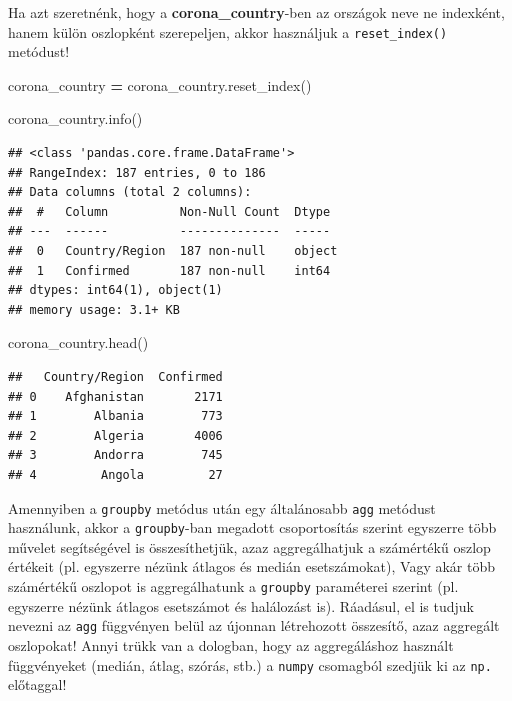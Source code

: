 \documentclass[
]{book}
\newenvironment{Shaded}{\begin{snugshade}}{\end{snugshade}}
\newcommand{\NormalTok}[1]{#1}
\newcommand{\OperatorTok}[1]{\textcolor[rgb]{0.81,0.36,0.00}{\textbf{#1}}}
\begin{document}
Ha azt szeretnénk, hogy a \textbf{corona\_country}-ben az országok neve ne indexként, hanem külön oszlopként szerepeljen, akkor használjuk a \texttt{reset\_index()} metódust!

\begin{Shaded}
\begin{Highlighting}[]
\NormalTok{corona\_country }\OperatorTok{=}\NormalTok{ corona\_country.reset\_index()}

\NormalTok{corona\_country.info()}
\end{Highlighting}
\end{Shaded}

\begin{verbatim}
## <class 'pandas.core.frame.DataFrame'>
## RangeIndex: 187 entries, 0 to 186
## Data columns (total 2 columns):
##  #   Column          Non-Null Count  Dtype 
## ---  ------          --------------  ----- 
##  0   Country/Region  187 non-null    object
##  1   Confirmed       187 non-null    int64 
## dtypes: int64(1), object(1)
## memory usage: 3.1+ KB
\end{verbatim}

\begin{Shaded}
\begin{Highlighting}[]
\NormalTok{corona\_country.head()}
\end{Highlighting}
\end{Shaded}

\begin{verbatim}
##   Country/Region  Confirmed
## 0    Afghanistan       2171
## 1        Albania        773
## 2        Algeria       4006
## 3        Andorra        745
## 4         Angola         27
\end{verbatim}

Amennyiben a \texttt{groupby} metódus után egy általánosabb \texttt{agg} metódust használunk, akkor a \texttt{groupby}-ban megadott csoportosítás szerint egyszerre több művelet segítségével is összesíthetjük, azaz aggregálhatjuk a számértékű oszlop értékeit (pl. egyszerre nézünk átlagos és medián esetszámokat), Vagy akár több számértékű oszlopot is aggregálhatunk a \texttt{groupby} paraméterei szerint (pl. egyszerre nézünk átlagos esetszámot és halálozást is). Ráadásul, el is tudjuk nevezni az \texttt{agg} függvényen belül az újonnan létrehozott összesítő, azaz aggregált oszlopokat!
Annyi trükk van a dologban, hogy az aggregáláshoz használt függvényeket (medián, átlag, szórás, stb.) a \texttt{numpy} csomagból szedjük ki az \texttt{np.} előtaggal!
\end{document}
